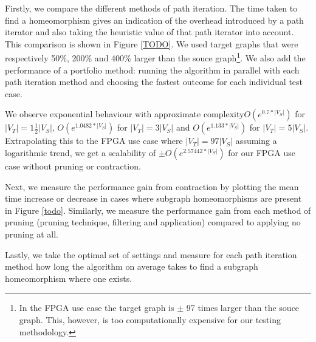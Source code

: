 Firstly, we compare the different methods of path iteration. The time taken to find a homeomorphism gives an indication of the overhead introduced by a path iterator and also taking the heuristic value of that path iterator into account. This comparison is shown in Figure \ref{TODO}. We used target graphs that were respectively 50\%, 200\% and 400\% larger than the souce graph\footnote{In the FPGA use case the target graph is $\pm$ 97 times larger than the souce graph. This, however, is too computationally expensive for our testing methodology.}. We also add the performance of a portfolio method: running the algorithm in parallel with each path iteration method and choosing the fastest outcome for each individual test case.

We observe exponential behaviour with approximate complexity$O(e^{0.7*|V_S|})$ for $|V_T|=1\frac{1}{2}|V_S|$, $O(e^{1.0482*|V_S|})$ for $|V_T|=3|V_S|$ and $O(e^{1.133*|V_S|})$ for $|V_T|=5|V_S|$. Extrapolating this to the FPGA use case where $|V_T|=97|V_S|$ assuming a logarithmic trend, we get a scalability of $\pm O(e^{2.57442*|V_S|})$ for our FPGA use case without pruning or contraction.

Next, we measure the performance gain from contraction by plotting the mean time increase or decrease in cases where subgraph homeomorphisms are present in Figure \ref{todo}. Similarly, we measure the performance gain from each method of pruning (pruning technique, filtering and application) compared to applying no pruning at all.

Lastly, we take the optimal set of settings and measure for each path iteration method how long the algorithm on average takes to find a subgraph homeomorphism where one exists.





